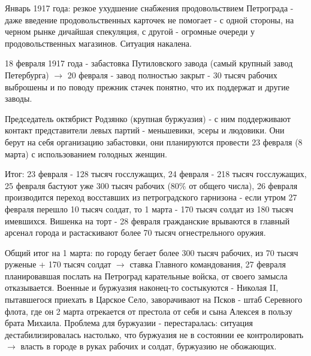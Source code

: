 Январь 1917 года: резкое ухудшение снабжения продовольствием Петрограда - даже введение продовольственных карточек не помогает - с одной стороны, на черном рынке дичайшая спекуляция, с другой - огромные очереди у продовольственных магазинов. Ситуация накалена.

18 февраля 1917 года - забастовка Путиловского завода (самый крупный завод Петербурга) $\rightarrow$ 20 февраля - завод полностью закрыт - 30 тысяч рабочих выброшены и по поводу прежник стачек понятно, что их поддержат и другие заводы.

Председатель октябрист Родзянко (крупная буржуазия) - с ним поддерживают контакт представители левых партий - меньшевики, эсеры и людовики. Они берут на себя организацию забастовки, они планируются провести 23 февраля (8 марта) с использованием голодных женщин.

Итог: 23 февраля - 128 тысяч госслужащих, 24 февраля - 218 тысяч госслужащих, 25 февраля бастуют уже 300 тысяч рабочих (80$\%$ от общего числа), 26 февраля производится переход восставших из петроградского гарнизона - если утром 27 февраля перешло 10 тысяч солдат, то 1 марта - 170 тысяч солдат из 180 тысяч имевшихся. Вишенка на торт - 28 февраля гражданские врываются в главный арсенал города и растаскивают более 70 тысяч огнестрельного оружия. 

Общий итог на 1 марта: по городу бегает более 300 тысяч рабочих, из 70 тысяч руженые + 170 тысяч солдат $\rightarrow$ ставка Главного командования, 27 февраля планировавшая послать на Петроград карательные войска, от своего замысла отказывается. Военные и буржуазия наконец-то состыкуются - Николая II, пытавшегося приехать в Царское Село, заворачивают на Псков - штаб Серевного флота, где он 2 марта отрекается от престола от себя и сына Алексея в пользу брата Михаила. Проблема для буржуазии - перестаралась: ситуация дестабилизировалась настолько, что буржуазия не в состоянии ее контролировать $\rightarrow$ власть в городе в руках рабочих и солдат, буржуазию не обожающих.